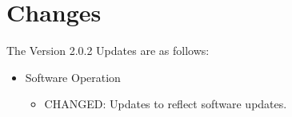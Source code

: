 \documentclass[11pt, letterpaper, titlepage]{article}
\begin{document}
\section*{Changes} \label{changes}
The Version 2.0.2 Updates are as follows:
\begin{itemize}
    \item Software Operation
    \begin{itemize}
        \item {\color{yellow} CHANGED:} Updates to reflect software updates.
    \end{itemize}
\end{itemize}
\newpage
\tableofcontents
\newpage
{}
\end{document}
